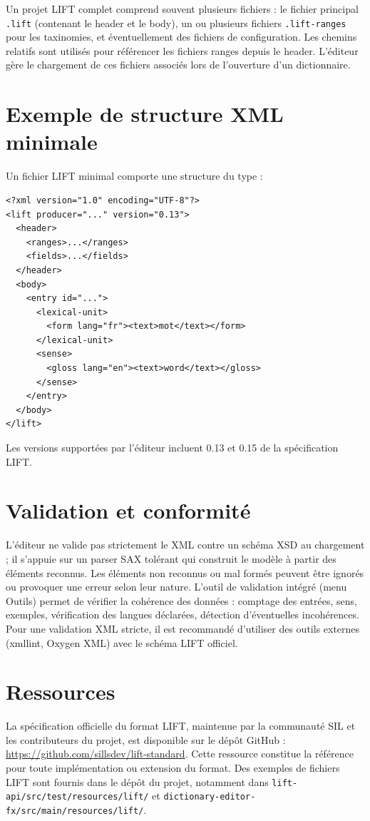 \documentclass[11pt,twoside,openany]{book}
\begin{document}
Un projet LIFT complet comprend souvent plusieurs fichiers : le fichier principal \texttt{.lift} (contenant le header et le body), un ou plusieurs fichiers \texttt{.lift-ranges} pour les taxinomies, et éventuellement des fichiers de configuration. Les chemins relatifs sont utilisés pour référencer les fichiers ranges depuis le header. L'éditeur gère le chargement de ces fichiers associés lors de l'ouverture d'un dictionnaire.

\section{Exemple de structure XML minimale}

Un fichier LIFT minimal comporte une structure du type :

\begin{verbatim}
<?xml version="1.0" encoding="UTF-8"?>
<lift producer="..." version="0.13">
  <header>
    <ranges>...</ranges>
    <fields>...</fields>
  </header>
  <body>
    <entry id="...">
      <lexical-unit>
        <form lang="fr"><text>mot</text></form>
      </lexical-unit>
      <sense>
        <gloss lang="en"><text>word</text></gloss>
      </sense>
    </entry>
  </body>
</lift>
\end{verbatim}

Les versions supportées par l'éditeur incluent 0.13 et 0.15 de la spécification LIFT.

\section{Validation et conformité}

L'éditeur ne valide pas strictement le XML contre un schéma XSD au chargement ; il s'appuie sur un parser SAX tolérant qui construit le modèle à partir des éléments reconnus. Les éléments non reconnus ou mal formés peuvent être ignorés ou provoquer une erreur selon leur nature. L'outil de validation intégré (menu Outils) permet de vérifier la cohérence des données : comptage des entrées, sens, exemples, vérification des langues déclarées, détection d'éventuelles incohérences. Pour une validation XML stricte, il est recommandé d'utiliser des outils externes (xmllint, Oxygen XML) avec le schéma LIFT officiel.

\section{Ressources}

La spécification officielle du format LIFT, maintenue par la communauté SIL et les contributeurs du projet, est disponible sur le dépôt GitHub : \url{https://github.com/sillsdev/lift-standard}. Cette ressource constitue la référence pour toute implémentation ou extension du format. Des exemples de fichiers LIFT sont fournis dans le dépôt du projet, notamment dans \texttt{lift-api/src/test/resources/lift/} et \texttt{dictionary-editor-fx/src/main/resources/lift/}.
\end{document}
